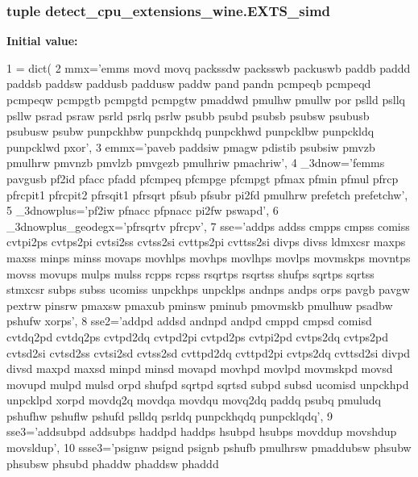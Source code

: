\subsubsection[{E\+X\+T\+S\+\_\+simd}]{\setlength{\rightskip}{0pt plus 5cm}tuple detect\+\_\+cpu\+\_\+extensions\+\_\+wine.\+E\+X\+T\+S\+\_\+simd}\label{namespacedetect__cpu__extensions__wine_ae1bc08abb8c9a3ded05290a441274dc4}
{\bfseries Initial value\+:}
\begin{DoxyCode}
1 = dict(
2     mmx=\textcolor{stringliteral}{'emms movd movq packssdw packsswb packuswb paddb paddd paddsb paddsw paddusb paddusw paddw pand
       pandn pcmpeqb pcmpeqd pcmpeqw pcmpgtb pcmpgtd pcmpgtw pmaddwd pmulhw pmullw por pslld psllq psllw psrad psraw
       psrld psrlq psrlw psubb psubd psubsb psubsw psubusb psubusw psubw punpckhbw punpckhdq punpckhwd punpcklbw
       punpckldq punpcklwd pxor'},
3     emmx=\textcolor{stringliteral}{'paveb paddsiw pmagw pdistib psubsiw pmvzb pmulhrw pmvnzb pmvlzb pmvgezb pmulhriw pmachriw'},
4     \_3dnow=\textcolor{stringliteral}{'femms pavgusb pf2id pfacc pfadd pfcmpeq pfcmpge pfcmpgt pfmax pfmin pfmul pfrcp pfrcpit1
       pfrcpit2 pfrsqit1 pfrsqrt pfsub pfsubr pi2fd pmulhrw prefetch prefetchw'},
5     \_3dnowplus=\textcolor{stringliteral}{'pf2iw pfnacc pfpnacc pi2fw pswapd'},
6     \_3dnowplus\_geodegx=\textcolor{stringliteral}{'pfrsqrtv pfrcpv'},
7     sse=\textcolor{stringliteral}{'addps addss cmpps cmpss comiss cvtpi2ps cvtps2pi cvtsi2ss cvtss2si cvttps2pi cvttss2si divps divss
       ldmxcsr maxps maxss minps minss movaps movhlps movhps movlhps movlps movmskps movntps movss movups mulps
       mulss rcpps rcpss rsqrtps rsqrtss shufps sqrtps sqrtss stmxcsr subps subss ucomiss unpckhps unpcklps andnps
       andps orps pavgb pavgw pextrw pinsrw pmaxsw pmaxub pminsw pminub pmovmskb pmulhuw psadbw pshufw xorps'},
8     sse2=\textcolor{stringliteral}{'addpd addsd andnpd andpd cmppd cmpsd comisd cvtdq2pd cvtdq2ps cvtpd2dq cvtpd2pi cvtpd2ps cvtpi2pd
       cvtps2dq cvtps2pd cvtsd2si cvtsd2ss cvtsi2sd cvtss2sd cvttpd2dq cvttpd2pi cvtps2dq cvttsd2si divpd divsd
       maxpd maxsd minpd minsd movapd movhpd movlpd movmskpd movsd movupd mulpd mulsd orpd shufpd sqrtpd sqrtsd subpd
       subsd ucomisd unpckhpd unpcklpd xorpd movdq2q movdqa movdqu movq2dq paddq psubq pmuludq pshufhw pshuflw
       pshufd pslldq psrldq punpckhqdq punpcklqdq'},
9     sse3=\textcolor{stringliteral}{'addsubpd addsubps haddpd haddps hsubpd hsubps movddup movshdup movsldup'},
10     ssse3=\textcolor{stringliteral}{'psignw psignd psignb pshufb pmulhrsw pmaddubsw phsubw phsubsw phsubd phaddw phaddsw phaddd
}
\end{DoxyCode}
